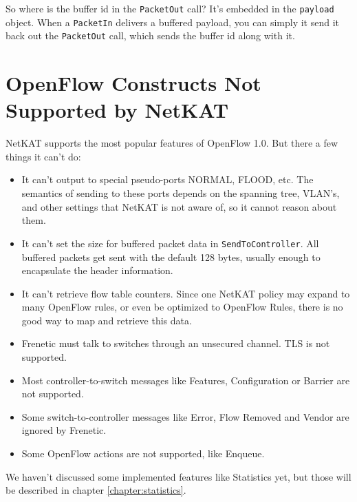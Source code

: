 So where is the buffer id in the \texttt{PacketOut} call?  It's embedded in the \texttt{payload} object.
When a \texttt{PacketIn} delivers a buffered payload, you can simply it send it back out the \texttt{PacketOut}
call, which sends the buffer id along with it.  

\section{OpenFlow Constructs Not Supported by NetKAT}

NetKAT supports the most popular features of OpenFlow 1.0.  But there a few things it can't do:

\begin{itemize}
\item It can't output to special pseudo-ports NORMAL, FLOOD, etc.  The semantics of sending to these ports
depends on the spanning tree, VLAN's, and other settings that NetKAT is not aware of, so it cannot reason
about them. 
\item It can't set the size for buffered packet data in \texttt{SendToController}.  All buffered packets
get sent with the default 128 bytes, usually enough to encapsulate the header information.
\item It can't retrieve flow table counters.  Since one NetKAT policy may expand to many OpenFlow rules, or even 
be optimized to OpenFlow Rules, there is no good way to map and retrieve this data.
\item Frenetic must talk to switches through an unsecured channel.  TLS is not supported.
\item Most controller-to-switch messages like Features, Configuration or Barrier are not supported.
\item Some switch-to-controller messages like Error, Flow Removed and Vendor are ignored by Frenetic. 
\item Some OpenFlow actions are not supported, like Enqueue.   
\end{itemize}

We haven't discussed some implemented features like Statistics yet, but those will be described in chapter \ref{chapter:statistics}.